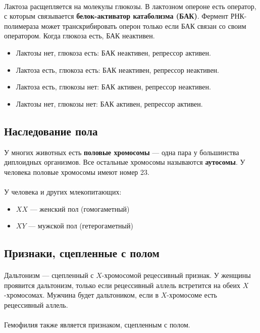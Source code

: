 \documentclass[dvipdfmx]{article}
\begin{document}
\paragraph{}
Лактоза расщепляется на молекулы глюкозы.
В лактозном опероне есть оператор, с которым связывается \textbf{белок-активатор катаболизма (БАК)}.
Фермент РНК-полимераза может транскрибировать оперон только если БАК связан со своим оператором.
Когда глюкоза есть, БАК неактивен.

\begin{itemize}
\item
  Лактозы нет, глюкоза есть: БАК неактивен, репрессор активен.
\item
  Лактоза есть, глюкоза есть: БАК неактивен, репрессор неактивен.
\item
  Лактоза есть, глюкозы нет: БАК активен, репрессор неактивен.
\item
  Лактозы нет, глюкозы нет: БАК активен, репрессор активен.
\end{itemize}

\subsection{Наследование пола}

У многих животных есть \textbf{половые хромосомы} --- одна пара у большинства диплоидных организмов.
Все остальные хромосомы называются \textbf{аутосомы}.
У человека половые хромосомы имеют номер 23.

\paragraph{}
У человека и других млекопитающих:
\begin{itemize}
\item
  $XX$ --- женский пол (гомогаметный)
\item
  $XY$ --- мужской пол (гетерогаметный)
\end{itemize}

\subsection{Признаки, сцепленные с полом}

\paragraph{}
Дальтонизм --- сцепленный с $X$-хромосомой рецессивный признак. У женщины проявится дальтонизм, только если рецессивный
аллель встретится на обеих $X$-хромосомах. Мужчина будет дальтоником, если в $X$-хромосоме есть рецессивный аллель.

\paragraph{}
Гемофилия также является признаком, сцепленным с полом. 
\end{document}

